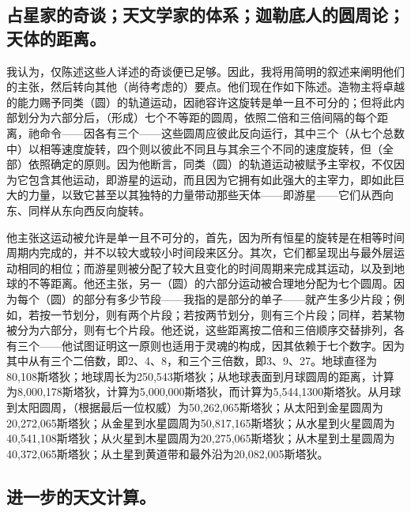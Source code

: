 
\subsection{占星家的奇谈；天文学家的体系；迦勒底人的圆周论；天体的距离。}

我认为，仅陈述这些人详述的奇谈便已足够。因此，我将用简明的叙述来阐明他们的主张，然后转向其他（尚待考虑的）要点。他们现在作如下陈述。造物主将卓越的能力赐予同类（圆）的轨道运动，因祂容许这旋转是单一且不可分的；但将此内部划分为六部分后，（形成）七个不等距的圆周，依照二倍和三倍间隔的每个距离，祂命令——因各有三个——这些圆周应彼此反向运行，其中三个（从七个总数中）以相等速度旋转，四个则以彼此不同且与其余三个不同的速度旋转，但（全部）依照确定的原则。因为他断言，同类（圆）的轨道运动被赋予主宰权，不仅因为它包含其他运动，即游星的运动，而且因为它拥有如此强大的主宰力，即如此巨大的力量，以致它甚至以其独特的力量带动那些天体——即游星——它们从西向东、同样从东向西反向旋转。\par

他主张这运动被允许是单一且不可分的，首先，因为所有恒星的旋转是在相等时间周期内完成的，并不以较大或较小时间段来区分。其次，它们都呈现出与最外层运动相同的相位；而游星则被分配了较大且变化的时间周期来完成其运动，以及到地球的不等距离。他还主张，另一（圆）的六部分运动被合理地分配为七个圆周。因为每个（圆）的部分有多少节段——我指的是部分的单子——就产生多少片段；例如，若按一节划分，则有两个片段；若按两节划分，则有三个片段；同样，若某物被分为六部分，则有七个片段。他还说，这些距离按二倍和三倍顺序交替排列，各有三个——他试图证明这一原则也适用于灵魂的构成，因其依赖于七个数字。因为其中从有三个二倍数，即2、4、8，和三个三倍数，即3、9、27。地球直径为80,108斯塔狄；地球周长为250,543斯塔狄；从地球表面到月球圆周的距离，计算为8,000,178斯塔狄，计算为5,000,000斯塔狄，而计算为5,544,1300斯塔狄。从月球到太阳圆周，（根据最后一位权威）为50,262,065斯塔狄；从太阳到金星圆周为20,272,065斯塔狄；从金星到水星圆周为50,817,165斯塔狄；从水星到火星圆周为40,541,108斯塔狄；从火星到木星圆周为20,275,065斯塔狄；从木星到土星圆周为40,372,065斯塔狄；从土星到黄道带和最外沿为20,082,005斯塔狄。\par


\subsection{进一步的天文计算。}

